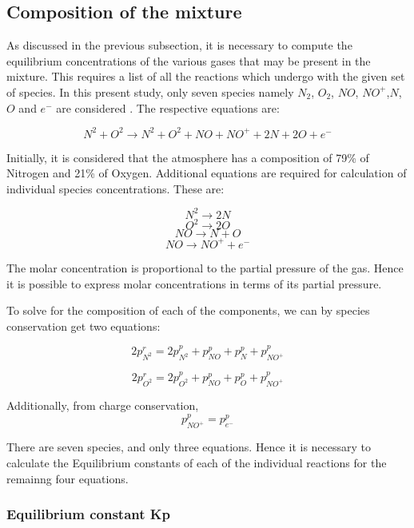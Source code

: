 \documentclass[]{aelab_aiaa-tc}%
\begin{document}
\subsection{Composition of the mixture}

As discussed in the previous subsection, it is necessary to compute the equilibrium concentrations of the various gases that may be present in the mixture. This requires a list of all the reactions which undergo with the given set of species. In this present study, only seven species namely $N_2$, $O_2$, $NO$, $NO^+$,$N$, $O$ and $e^-$ are considered \cite{carlos:1}. The respective equations are:

$$ N^2 + O^2 \longrightarrow N^2 + O^2 + NO + NO^+ + 2N + 2O + e^- $$

Initially, it is considered that the atmosphere has a composition of 79\% of Nitrogen and 21\% of Oxygen. Additional equations are required for calculation of individual species concentrations. These are:

$$ N^2 \longrightarrow 2N $$
$$ O^2 \longrightarrow 2O $$
$$ NO  \longrightarrow N + O $$
$$ NO  \longrightarrow NO^+ + e^- $$

The molar concentration is proportional to the partial pressure of the gas. Hence it is possible to express molar concentrations in terms of its partial pressure.

To solve for the composition of each of the components, we can by species conservation get two equations:

\begin{equation}
2p^r_{N^2} = 2p^p_{N^2} + p^p_{NO} + p^p_{N} + p^p_{NO^+} 	
\end{equation}

\begin{equation}
2p^r_{O^2} = 2p^p_{O^2} + p^p_{NO} + p^p_{O} + p^p_{NO^+} 	
\end{equation}

Additionally, from charge conservation,
\begin{equation}
p^p_{NO^+} = p^p_{e^-}	
\end{equation}

There are seven species, and only three equations. Hence it is necessary to calculate the Equilibrium constants of each of the individual reactions for the remainng four equations.

\subsubsection{Equilibrium constant Kp}
\end{document}
